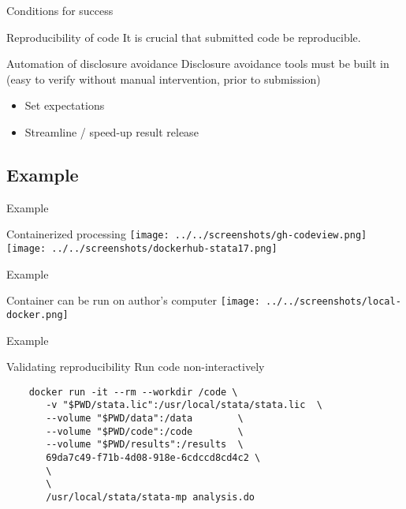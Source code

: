 \begin{frame}{Conditions for success}
\begin{block}{Reproducibility of code}
It is crucial that submitted code be reproducible. 
\end{block}
\begin{block}{Automation of disclosure avoidance}
Disclosure avoidance tools must be built in (easy to verify without manual intervention, prior to submission)
\begin{itemize}
    \item Set expectations
    \item Streamline / speed-up result release
\end{itemize}
\end{block}
\end{frame}


\subsection{Example}
\begin{frame}{Example}
\begin{block}{Containerized processing}
    \texttt{[image: ../../screenshots/gh-codeview.png]}
    \texttt{[image: ../../screenshots/dockerhub-stata17.png]}
\end{block}
\end{frame}

\begin{frame}{Example}
\begin{block}{Container can be run on author's computer}
  \centering  \texttt{[image: ../../screenshots/local-docker.png]}
\end{block}
\end{frame}

\begin{frame}[fragile]{Example}
\begin{block}{Validating reproducibility}
Run code non-interactively
	 {\footnotesize
	\begin{verbatim}
	docker run -it --rm --workdir /code \
       -v "$PWD/stata.lic":/usr/local/stata/stata.lic  \ 
       --volume "$PWD/data":/data        \
       --volume "$PWD/code":/code        \ 
       --volume "$PWD/results":/results  \
       69da7c49-f71b-4d08-918e-6cdccd8cd4c2 \
       \
       \
       /usr/local/stata/stata-mp analysis.do

	\end{verbatim}
 }
\end{block}
\end{frame}


